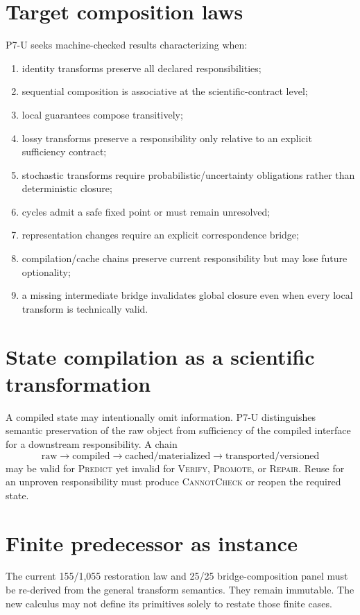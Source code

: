 \documentclass[11pt]{article}
\begin{document}
\section{Target composition laws}
P7-U seeks machine-checked results characterizing when:
\begin{enumerate}
    \item identity transforms preserve all declared responsibilities;
    \item sequential composition is associative at the scientific-contract level;
    \item local guarantees compose transitively;
    \item lossy transforms preserve a responsibility only relative to an explicit sufficiency contract;
    \item stochastic transforms require probabilistic/uncertainty obligations rather than deterministic closure;
    \item cycles admit a safe fixed point or must remain unresolved;
    \item representation changes require an explicit correspondence bridge;
    \item compilation/cache chains preserve current responsibility but may lose future optionality;
    \item a missing intermediate bridge invalidates global closure even when every local transform is technically valid.
\end{enumerate}

\section{State compilation as a scientific transformation}
A compiled state may intentionally omit information. P7-U distinguishes semantic preservation of the raw object from sufficiency of the compiled interface for a downstream responsibility. A chain
\[
\text{raw}\to\text{compiled}\to\text{cached/materialized}\to\text{transported/versioned}
\]
may be valid for \textsc{Predict} yet invalid for \textsc{Verify}, \textsc{Promote}, or \textsc{Repair}. Reuse for an unproven responsibility must produce \textsc{CannotCheck} or reopen the required state.

\section{Finite predecessor as instance}
The current 155/1,055 restoration law and 25/25 bridge-composition panel must be re-derived from the general transform semantics. They remain immutable. The new calculus may not define its primitives solely to restate those finite cases.
\end{document}

